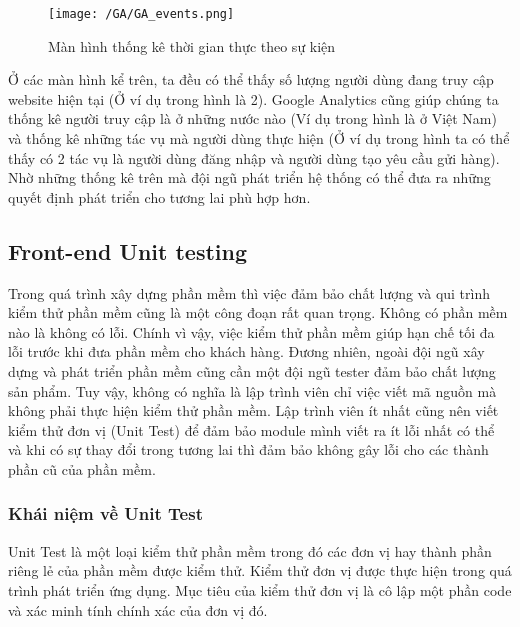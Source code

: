 			 	\begin{figure}[H]
			 		\texttt{[image: /GA/GA\_events.png]}
			 		\centering
			 		\caption{Màn hình thống kê thời gian thực theo sự kiện}
			 	\end{figure}
			 	
			 	Ở các màn hình kể trên, ta đều có thể thấy số lượng người dùng đang truy cập website hiện tại (Ở ví dụ trong hình là 2). Google Analytics cũng giúp chúng ta thống kê người truy cập là ở những nước nào (Ví dụ trong hình là ở Việt Nam) và thống kê những tác vụ mà người dùng thực hiện (Ở ví dụ trong hình ta có thể thấy có 2 tác vụ là người dùng đăng nhập và người dùng tạo yêu cầu gửi hàng). Nhờ những thống kê trên mà đội ngũ phát triển hệ thống có thể đưa ra những quyết định phát triển cho tương lai phù hợp hơn.
			 	
			 	\subsection{Front-end Unit testing}
			 	Trong quá trình xây dựng phần mềm thì việc đảm bảo chất lượng và qui trình kiểm thử phần mềm cũng là một công đoạn rất quan trọng. Không có phần mềm nào là không có lỗi. Chính vì vậy, việc kiểm thử phần mềm giúp hạn chế tối đa lỗi trước khi đưa phần mềm cho khách hàng. Đương nhiên, ngoài đội ngũ xây dựng và phát triển phần mềm cũng cần một đội ngũ tester đảm bảo chất lượng sản phẩm. Tuy vậy, không có nghĩa là lập trình viên chỉ việc viết mã nguồn mà không phải thực hiện kiểm thử phần mềm. Lập trình viên ít nhất cũng nên viết kiểm thử đơn vị (Unit Test) để đảm bảo module mình viết ra ít lỗi nhất có thể và khi có sự thay đổi trong tương lai thì đảm bảo không gây lỗi cho các thành phần cũ của phần mềm.
			 	
			 	\subsubsection{Khái niệm về Unit Test}
			 	Unit Test là một loại kiểm thử phần mềm trong đó các đơn vị hay thành phần riêng lẻ của phần mềm được kiểm thử. Kiểm thử đơn vị được thực hiện trong quá trình phát triển ứng dụng. Mục tiêu của kiểm thử đơn vị là cô lập một phần code và xác minh tính chính xác của đơn vị đó.
			 	
